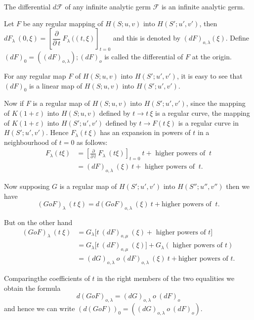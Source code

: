 The differential $d \mathscr{F}$ of any infinite analytic germ
$\mathscr{F}$ is an infinite analytic germ. 

Let $F$ be any regular mapping of $H(S; u, v)$ into $H(S'; u',  v')$,
then\pageoriginale $dF_\lambda ~ (0,  \xi) = \left[  \dfrac{\partial}{\partial ~ t }
  ~ F_\lambda ~ ((t,  \xi)\right]_{t =0}$ and this is denoted by
$(dF)_{o, \lambda} (\xi)$. Define $(dF)_0 = ((dF)_{o, \lambda});
(dF)_o$ is called the differential of $F$ at the origin. 

For any regular map $F$ of $H(S; u, v)$ into $H(S'; u',  v')$,  it is
easy to see that $(dF)_0$ is a linear map of $H(S; u, v)$ into $H(S';
u',  v')$. 

Now if $F$ is a regular map of $H(S; u, v)$ into $H(S'; u',  v')$,
since the mapping of $K(1+ \varepsilon)$ into $H(S; u, v)$ defined by
$ t \rightarrow t ~ \xi$ is a regular curve,  the mapping of $K(1+
\varepsilon)$ into $H(S'; u',  v')$ defined by $t \rightarrow F(t ~
\xi)$ is a regular curve in $H(S'; u', v')$. Hence $F_\lambda (t ~
\xi)$ has an expansion in powers of $t$ in a neighbourhood of $t = 0$
as follows: 
\begin{align*}
  F_\lambda (t \xi) & = \left[ \frac{\partial}{\partial ~ t} ~
    F_\lambda ~ (t \xi)\right]_{t =0} ~ t + \text{ higher powers of } ~
  t\\ 
  & = (dF)_{o, \lambda} ~ (\xi) ~ t + \text{ higher powers of } ~ t.
\end{align*}

Now supposing $G$ is a regular map of $H(S'; u',  v')$ into $H(S'';
u'',  v'')$ then we have  
$$
(GoF)_\lambda ~ (t ~ \xi) = d(GoF)_{o, \lambda} ~ (\xi) ~ t + \text{
  higher powers of } ~ t. 
$$

But on the other hand
\begin{align*}
  (GoF)_\lambda ~ (t ~ \xi) & = G_\lambda \Big[  t ~ (dF)_{o, \mu} ~
    (\xi) + \text{ higher powers of } t\Big]\\ 
  & = G_\lambda \Big[  t ~ (dF)_{o, \mu} ~ (\xi)\Big] + G_\lambda
  (\text{ higher powers of } t)\\ 
  & = (dG)_{o, \lambda} ~ o ~ (dF)_{o, \lambda} ~ (\xi) ~ t + \text{
    higher powers of } t. 
\end{align*}

Comparing\pageoriginale the coefficients of $t$ in the right members of the two
equalities we obtain the formula 
$$
d(GoF)_{o, \lambda} = (dG)_{o, \lambda} ~ o ~ (dF)_o
$$
and hence we can write $(d(GoF))_0 = ((dG)_{o, \lambda} ~ o ~ (dF)_o)$.

